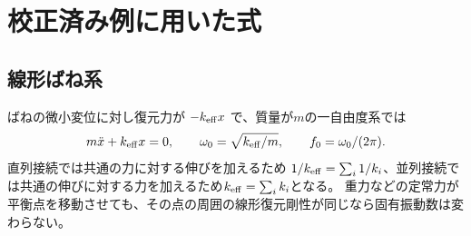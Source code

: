 \chapter{校正済み例に用いた式}
\section{線形ばね系}
ばねの微小変位に対し復元力が $-k_{\rm eff}x$ で、質量が$m$の一自由度系では
\[m\ddot{x}+k_{\rm eff}x=0,\qquad \omega_0=\sqrt{k_{\rm eff}/m},\qquad f_0=\omega_0/(2\pi).\]
直列接続では共通の力に対する伸びを加えるため
$1/k_{\rm eff}=\sum_i1/k_i$、並列接続では共通の伸びに対する力を加えるため$k_{\rm eff}=\sum_i k_i$となる。
重力などの定常力が平衡点を移動させても、その点の周囲の線形復元剛性が同じなら固有振動数は変わらない。
